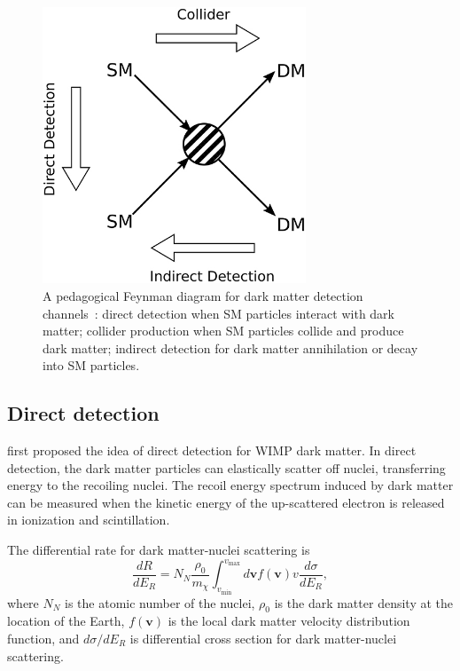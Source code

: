 \documentclass[doublespace,nopageskip]{VTthesis} %
\begin{document}
\begin{figure}[htb]
    \centering
    \includegraphics[width=0.7\textwidth]{Figures/Intro/dm_diagram.jpg}
    \caption{A pedagogical Feynman diagram for dark matter detection channels~\cite{2019FrP.....7...75G}: direct detection when SM particles interact with dark matter; collider production when SM particles collide and produce dark matter; indirect detection for dark matter annihilation or decay into SM particles.}
    \label{fig:dm_search}
\end{figure}

\subsection{Direct detection}

\citet{1985PhRvD..31.3059G} first proposed the idea of direct detection for WIMP dark matter. In direct detection, the dark matter particles can elastically scatter off nuclei, transferring energy to the recoiling nuclei. The recoil energy spectrum induced by dark matter can be measured when the kinetic energy of the up-scattered electron is released in ionization and scintillation. 

The differential rate for dark matter-nuclei scattering is
\begin{equation}
    \frac{dR}{dE_R} = N_N\frac{\rho_0}{m_\chi}\int_{v_\mathrm{min}}^{v_\mathrm{max}}d\bm{v}f(\bm{v})v\frac{d\sigma}{dE_R},
\end{equation}
where $N_N$ is the atomic number of the nuclei, $\rho_0$ is the dark matter density at the location of the Earth, $f(\bm{v})$ is the local dark matter velocity distribution function, and $d\sigma/dE_R$ is differential cross section for dark matter-nuclei scattering.
\end{document}
